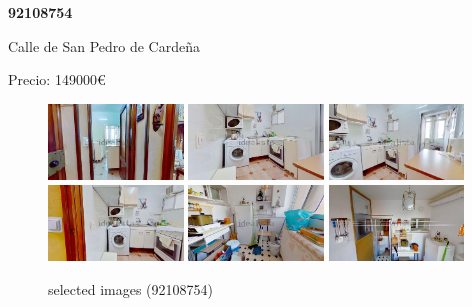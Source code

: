 \documentclass[10pt,a4paper]{report}
\begin{document}
\newpage
\begin{center}
\begin{large}
\textbf{92108754}\\[10px]
\end{large}
Calle de San Pedro de Cardeña
\end{center}
Precio: 149000€
\begin{figure}[htbp]

\includegraphics[width=0.32\textwidth]{arfima/92108754/92108754-001.jpg}
\includegraphics[width=0.32\textwidth]{arfima/92108754/92108754-002.jpg}
\includegraphics[width=0.32\textwidth]{arfima/92108754/92108754-003.jpg}
\includegraphics[width=0.32\textwidth]{arfima/92108754/92108754-004.jpg}
\includegraphics[width=0.32\textwidth]{arfima/92108754/92108754-005.jpg}
\includegraphics[width=0.32\textwidth]{arfima/92108754/92108754-006.jpg}
\caption{selected images (92108754)}
\end{figure}
\end{document}
